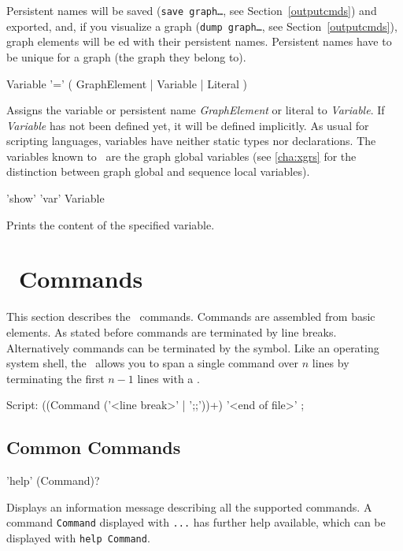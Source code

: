 \begin{note}
Persistent names will be saved (\texttt{save graph\dots}, see Section~\ref{outputcmds}) and exported, and, if you visualize a graph (\texttt{dump graph\dots}, see Section~\ref{outputcmds}), graph elements will be ed with their persistent names.
Persistent names have to be unique for a graph (the graph they belong to).
\end{note}

\begin{rail}
  Variable '=' ( GraphElement | Variable | Literal )
\end{rail}
Assigns the variable or persistent name \emph{GraphElement} or literal to \emph{Variable}.
If \emph{Variable} has not been defined yet, it will be defined implicitly.
As usual for scripting languages, variables have neither static types nor declarations.
The variables known to \GrShell\ are the graph global variables (see \ref{cha:xgrs} for the distinction between graph global and sequence local variables).

\begin{rail} 
'show' 'var' Variable 
\end{rail}
Prints the content of the specified variable.


\section{\GrShell\ Commands}
This section describes the \GrShell\ commands. Commands are assembled from basic elements. 
As stated before commands are terminated by line breaks. Alternatively commands can be terminated by the \indexed{\texttt{;;}} symbol.
Like an operating system shell, the \GrShell\ allows you to span a single command over $n$ lines by terminating the first $n-1$ lines with a .  
\begin{rail}
  Script: ((Command ('<line break>' | ';;'))+) '<end of file>' ;
\end{rail}


\subsection{Common Commands}
\label{commcommands}
\begin{rail}
  'help' (Command)?
\end{rail}
Displays an information message describing all the supported commands. 
A command \texttt{Command} displayed with \texttt{...} has further help available, which can be displayed with \texttt{help Command}.

